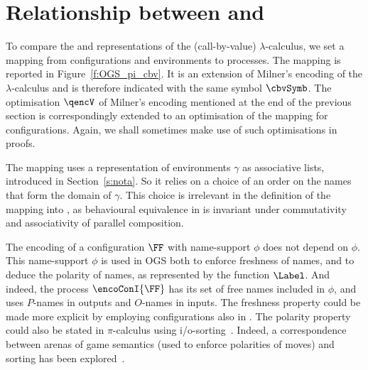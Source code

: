 \section{Relationship between \piI and \AOGS}
\label{s:encoGames}
             

To compare the \AOGS and \piI representations of the (call-by-value)
$\lambda$-calculus, we set a mapping from \AOGS configurations and environments 
to  \piI processes.
The mapping is reported in Figure~\ref{f:OGS_pi_cbv}. 
It is an extension of Milner's encoding of the $\lambda$-calculus and is
therefore indicated with the same symbol  $\cbvSymb$.
The optimisation $\qencV$ of Milner's encoding mentioned at the end of
the previous section is correspondingly extended to an optimisation of the mapping for
configurations. Again, we shall sometimes make use of such optimisations in proofs. 

The mapping uses a representation of environments $\gamma$ as associative lists, introduced in
Section~\ref{s:nota}.
So it relies on a choice of an order on the names that form the domain of $\gamma$.
This choice is irrelevant in the definition of the mapping into \piI, as behavioural equivalence in
\piI is invariant under commutativity and associativity of parallel composition.

\begin{remark}
 The  encoding of a configuration $\FF$ with name-support $\phi$ 
does not depend on $\phi$.
This name-support $\phi$ is used in OGS both to enforce freshness of names,
and to deduce the polarity of names,
as represented by the function $\Label$.
And indeed, the process $\encoConI{\FF}$ has its set of free names included
in $\phi$, and uses $P$-names in outputs and $O$-names in inputs.
The freshness property could be made more explicit by employing configurations also in \piI.
The polarity property could also be stated in $\pi$-calculus using 
i/o-sorting~\cite{PiSa96b}.
Indeed, a correspondence between arenas of game semantics (used to enforce polarities of moves) 
and sorting has  been 
explored~\cite{10.1145/224164.224189,10.1016/S0304-3975-99-00039-0}.
\end{remark}


